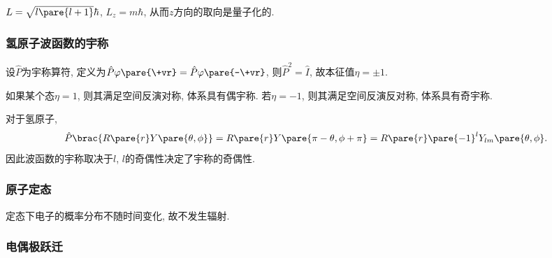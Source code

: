 \documentclass[hidelinks]{ctexart}
\begin{document}
$L = \sqrt{l\pare{l+1}}\hbar$, $L_z = m\hbar$, 从而$z$方向的取向是量子化的.



\subsubsection{氢原子波函数的宇称} %
\label{ssub:氢原子波函数的宇称}

设$\hat P$为宇称算符, 定义为$\hat P\varphi\pare{\+vr} = \hat P\varphi\pare{-\+vr}$, 则$\hat P^2 = \hat I$, 故本征值$\eta = \pm 1$.
\par
如果某个态$\eta = 1$, 则其满足空间反演对称, 体系具有偶宇称. 若$\eta = -1$, 则其满足空间反演反对称, 体系具有奇宇称.
\begin{ex}
    对于氢原子,
    \[ \hat P\brac{R\pare{r}Y\pare{\theta,\phi}} = R\pare{r}Y\pare{\pi - \theta,\phi + \pi} = R\pare{r}\pare{-1}^lY_{lm}\pare{\theta,\phi}. \]
    因此波函数的宇称取决于$l$, $l$的奇偶性决定了宇称的奇偶性.
\end{ex}


\subsubsection{原子定态} %
\label{ssub:原子定态}

定态下电子的概率分布不随时间变化, 故不发生辐射.


\subsubsection{电偶极跃迁} %
\label{ssub:电偶极跃迁}
\end{document}
